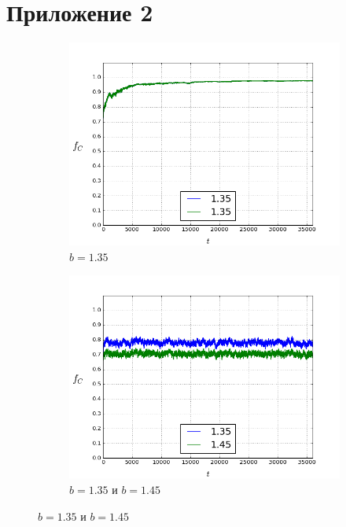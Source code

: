 \documentclass[a4paper]{article}
\begin{document}
	\section{Приложение 2}
\begin{figure}[H]
	\begin{subfigure}{.5\textwidth}
		\includegraphics[width=.8\linewidth]{135-135.png}
		\caption{$b=1.35$}
	\end{subfigure}
	\begin{subfigure}{.5\textwidth}
		\includegraphics[width=.8\linewidth]{135-145.png}
		\caption{$b=1.35$ и $b=1.45$}
	\end{subfigure}%
	

\end{figure}
\end{document}

